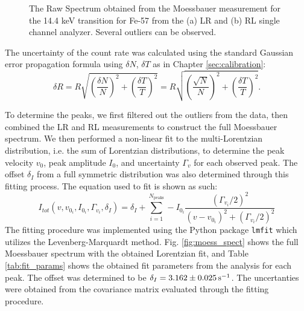 \documentclass[a4paper]{report}
\numberwithin{equation}{section}
\begin{document}
\begin{figure}[htb!]
	\centering
	\quad
	\centering
	\caption{The Raw Spectrum obtained from the Moessbauer measurement for the 14.4 keV transition for Fe-57 from the (a) LR and (b) RL 
	single channel analyzer. Several outliers can be observed.}
	\label{fig:moess_raw}
\end{figure}


The uncertainty of the count rate was calculated using the standard Gaussian error propagation formula using $\delta N$, $\delta T$ 
as in Chapter \ref{sec:calibration}:
\begin{equation}
	\delta R = R \sqrt{\left(\frac{\delta N}{N}\right)^2 + \left(\frac{\delta T}{T}\right)^2} = R \sqrt{\left(\frac{\sqrt{N}}{N}\right)^2 + \left(\frac{\delta T}{T}\right)^2} .
\end{equation} \par 


To determine the peaks, we first filtered out the outliers from the data, then combined the LR and RL measurements to construct 
the full Moessbauer spectrum. We then performed a non-linear fit to the multi-Lorentzian distribution, i.e. the sum of Lorentzian
distributions, to determine the peak velocity $v_0$, peak amplitude $I_0$, and uncertainty $\Gamma_v$ for each observed peak. The 
offset $\delta_I$ from a full symmetric distribution was also determined through this fitting process. The equation used to fit
is shown as such:
\begin{equation}
    I_{tot}(v, v_{0_i}, I_{0_i}, \Gamma_{v_i}, \delta_I) = \delta_I + \sum \limits_{i=1}^{N_{\mathrm{peaks}}} - I_{0_i} \frac{(\Gamma_{v_i} / 2)^2}{(v - v_{0_i})^2 + (\Gamma_{v_i} / 2)^2}
    \label{eq:multi_lorentzian}
\end{equation}
The fitting procedure was implemented using the Python package \texttt{lmfit} which utilizes the Levenberg-Marquardt method. 
Fig. \ref{fig:moess_spect} shows the full Moessbauer spectrum with the obtained Lorentzian fit, and Table \ref{tab:fit_params} shows the obtained fit parameters from the analysis for each peak.
The offset was determined to be $\delta_I = \SI{3.162 \pm 0.025}{\per\second} $. The uncertanties were obtained from the 
covariance matrix evaluated through the fitting procedure. \par 
\end{document}
